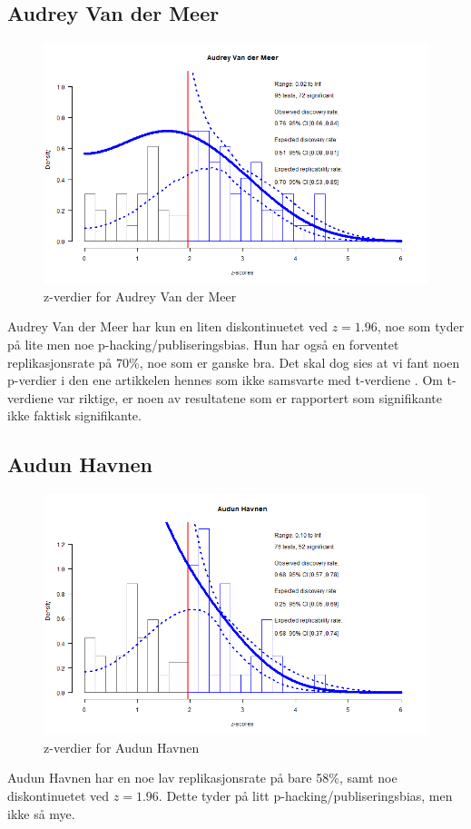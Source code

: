 \documentclass[doc,norsk]{apa7}
\begin{document}
\subsection{Audrey Van der Meer}
\begin{figure}[h!]
    \centering
    \includegraphics[width=\textwidth]{images/Audrey Van der Meer.png}
    \caption{z-verdier for Audrey Van der Meer}
\end{figure}
Audrey Van der Meer har kun en liten diskontinuetet ved $z=1.96$, noe som tyder på lite men noe p-hacking/publiseringsbias. Hun har også en forventet replikasjonsrate på 70\%, noe som er ganske bra. Det skal dog sies at vi fant noen p-verdier i den ene artikkelen hennes som ikke samsvarte med t-verdiene \parencite{audry-feil}. Om t-verdiene var riktige, er noen av resultatene som er rapportert som signifikante ikke faktisk signifikante.

\subsection{Audun Havnen}
\begin{figure}[h!]
    \centering
    \includegraphics[width=\textwidth]{images/Audun Havnen.png}
    \caption{z-verdier for Audun Havnen}
\end{figure}
Audun Havnen har en noe lav replikasjonsrate på bare 58\%, samt noe diskontinuetet ved $z=1.96$. Dette tyder på litt p-hacking/publiseringsbias, men ikke så mye.
\end{document}
